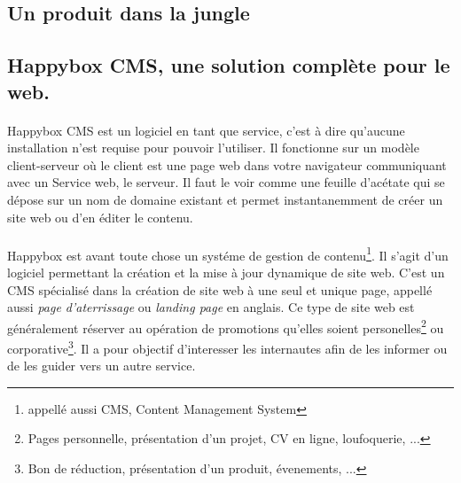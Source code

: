 \documentclass[11pt, a4paper ]{article}
\let\stdsection\section
\renewcommand\section{\newpage\stdsection}
\begin{document}
\begin{spacing}{1.5}





		\section{Un produit dans la jungle} %

			\subsection{Happybox CMS, une solution complète pour le web.}

\paragraph{}
Happybox CMS est un logiciel en tant que service, c'est à dire qu'aucune installation n'est requise pour pouvoir l'utiliser. Il fonctionne sur un modèle client-serveur où le client est une page web dans votre navigateur communiquant avec un Service web, le serveur. Il faut le voir comme une feuille d'acétate qui se dépose sur un nom de domaine existant et permet instantanemment de créer un site web ou d'en éditer le contenu.

	\paragraph{}
Happybox est avant toute chose un systéme de gestion de contenu\footnote{appellé aussi CMS, Content Management System}. Il s'agit d'un logiciel permettant la création et la mise à jour dynamique de site web.
C'est un CMS spécialisé dans la création de site web à une seul et unique page, appellé aussi \emph{page d'aterrissage} ou \emph{landing page} en anglais. Ce type de site web est généralement réserver au opération de promotions qu'elles soient personelles\footnote{Pages personnelle, présentation d'un projet, CV en ligne, loufoquerie, ...} ou corporative\footnote{Bon de réduction, présentation d'un produit, évenements, ...}. Il a pour objectif d'interesser les internautes afin de les informer ou de les guider vers un autre service.


\end{spacing}
\end{document}
